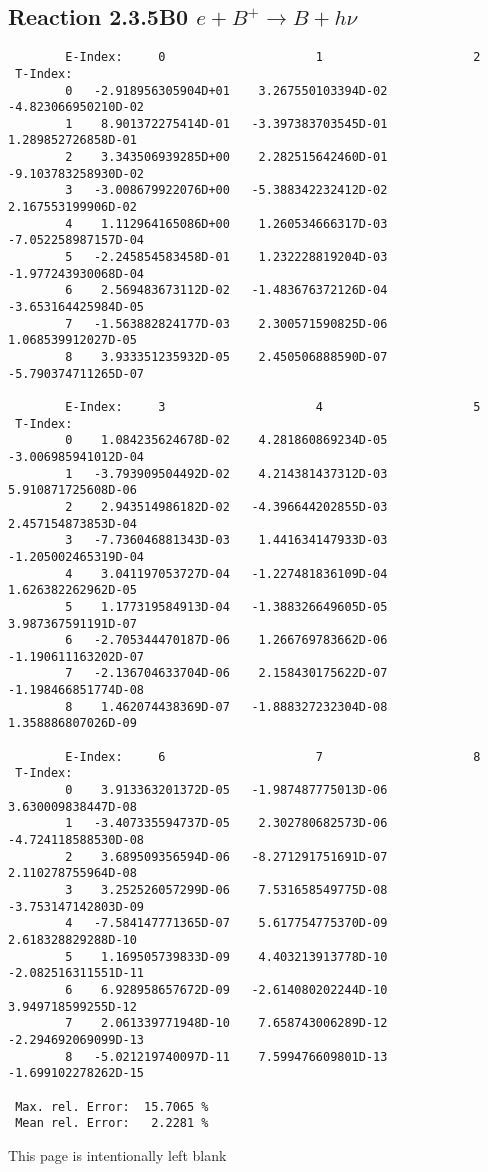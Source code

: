 \subsection{
Reaction 2.3.5B0 $ e + B^+ \rightarrow B + h\nu $
}


\begin{verbatim}
        E-Index:     0                     1                     2
 T-Index:
        0   -2.918956305904D+01    3.267550103394D-02   -4.823066950210D-02
        1    8.901372275414D-01   -3.397383703545D-01    1.289852726858D-01
        2    3.343506939285D+00    2.282515642460D-01   -9.103783258930D-02
        3   -3.008679922076D+00   -5.388342232412D-02    2.167553199906D-02
        4    1.112964165086D+00    1.260534666317D-03   -7.052258987157D-04
        5   -2.245854583458D-01    1.232228819204D-03   -1.977243930068D-04
        6    2.569483673112D-02   -1.483676372126D-04   -3.653164425984D-05
        7   -1.563882824177D-03    2.300571590825D-06    1.068539912027D-05
        8    3.933351235932D-05    2.450506888590D-07   -5.790374711265D-07

        E-Index:     3                     4                     5
 T-Index:
        0    1.084235624678D-02    4.281860869234D-05   -3.006985941012D-04
        1   -3.793909504492D-02    4.214381437312D-03    5.910871725608D-06
        2    2.943514986182D-02   -4.396644202855D-03    2.457154873853D-04
        3   -7.736046881343D-03    1.441634147933D-03   -1.205002465319D-04
        4    3.041197053727D-04   -1.227481836109D-04    1.626382262962D-05
        5    1.177319584913D-04   -1.388326649605D-05    3.987367591191D-07
        6   -2.705344470187D-06    1.266769783662D-06   -1.190611163202D-07
        7   -2.136704633704D-06    2.158430175622D-07   -1.198466851774D-08
        8    1.462074438369D-07   -1.888327232304D-08    1.358886807026D-09

        E-Index:     6                     7                     8
 T-Index:
        0    3.913363201372D-05   -1.987487775013D-06    3.630009838447D-08
        1   -3.407335594737D-05    2.302780682573D-06   -4.724118588530D-08
        2    3.689509356594D-06   -8.271291751691D-07    2.110278755964D-08
        3    3.252526057299D-06    7.531658549775D-08   -3.753147142803D-09
        4   -7.584147771365D-07    5.617754775370D-09    2.618328829288D-10
        5    1.169505739833D-09    4.403213913778D-10   -2.082516311551D-11
        6    6.928958657672D-09   -2.614080202244D-10    3.949718599255D-12
        7    2.061339771948D-10    7.658743006289D-12   -2.294692069099D-13
        8   -5.021219740097D-11    7.599476609801D-13   -1.699102278262D-15

 Max. rel. Error:  15.7065 %
 Mean rel. Error:   2.2281 %

\end{verbatim}
\newpage
This page is intentionally left blank
\newpage
